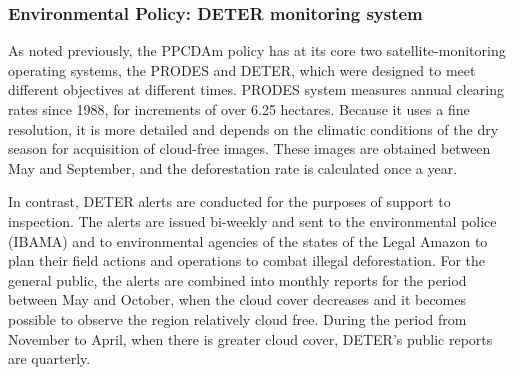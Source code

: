 

\subsubsection{Environmental Policy: DETER monitoring system}

As noted previously, the PPCDAm policy has at its core two satellite-monitoring operating systems, the PRODES and DETER, which were designed to meet different objectives at different times. PRODES system measures annual clearing rates since 1988, for increments of over 6.25 hectares. Because it uses a fine resolution, it is more detailed and depends on the climatic conditions of the dry season for acquisition of cloud-free images. These images are obtained between May and September, and the deforestation rate is calculated once a year.

In contrast, DETER alerts are conducted for the purposes of support to inspection. The alerts are issued bi-weekly and sent to the environmental police (IBAMA) and to environmental agencies of the states of the Legal Amazon to plan their field actions and operations to combat illegal deforestation. For the general public, the alerts are combined into monthly reports for the period between May and October, when the cloud cover decreases and it becomes possible to observe the region relatively cloud free. During the period from November to April, when there is greater cloud cover, DETER's public reports are quarterly.

